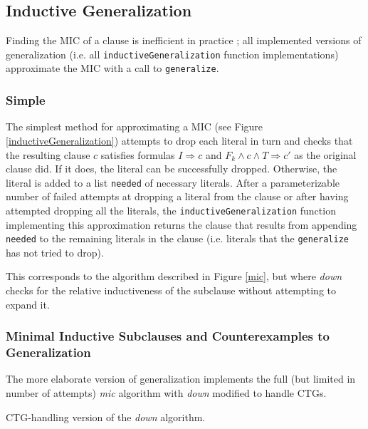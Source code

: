 \documentclass[12pt,a4paper,twoside,openright]{report}
\begin{document}
{{\subsection{Inductive Generalization}
\label{impl:generalization}
Finding the MIC of a clause is inefficient in practice
\cite{griggio14};
all implemented versions of generalization
(i.e. all \verb,inductiveGeneralization, function implementations) approximate the MIC with a call to
\verb,generalize,.

\subsubsection{Simple}
The simplest method for approximating a MIC (see Figure \ref{inductiveGeneralization})
attempts to drop each literal in turn and checks
that the resulting clause $c$ satisfies formulas $I \Rightarrow c$ and
$F_k \wedge c \wedge T \Rightarrow c'$ as the original clause did.
If it does, the literal can be successfully dropped.
Otherwise, the literal is added to a list \verb,needed, of necessary literals.
After a parameterizable number of failed attempts at dropping a literal from the clause or after
having attempted dropping all the literals, the
\verb,inductiveGeneralization, function implementing this approximation
returns the clause that results from appending \verb,needed, to the remaining
literals in the clause (i.e. literals that the \verb,generalize, has not tried to drop).

This corresponds to the algorithm described in Figure \ref{mic}, but where {\it down}
checks for the relative inductiveness of the subclause without attempting to expand it.

\subsubsection{Minimal Inductive Subclauses and Counterexamples to Generalization}
The more elaborate version of generalization implements the full
(but limited in number of attempts) {\it mic} algorithm with {\it down} modified
to handle CTGs.

\begin{algorithm}[t]
\DontPrintSemicolon
{}
\caption{CTG-handling version of the {\it down} algorithm.}
\label{ctgdown}
\end{algorithm}

}}
\end{document}

